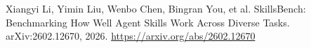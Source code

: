 Xiangyi Li, Yimin Liu, Wenbo Chen, Bingran You, et al.
\newblock SkillsBench: Benchmarking How Well Agent Skills Work Across Diverse Tasks.
\newblock arXiv:2602.12670, 2026.
\newblock \url{https://arxiv.org/abs/2602.12670}
